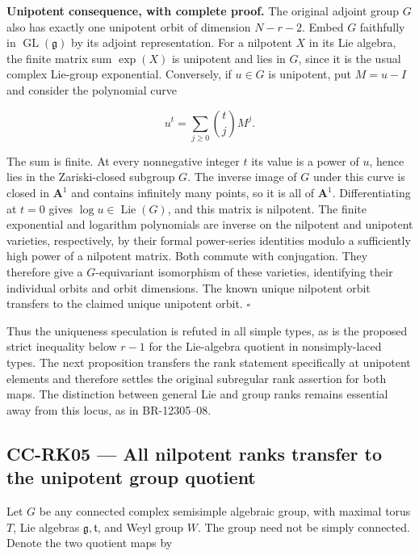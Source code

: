 \documentclass[11pt,a4paper]{article}
\theoremstyle{definition}\newtheorem{definition}[theorem]{Definition}
\theoremstyle{remark}\newtheorem{remark}[theorem]{Remark}
\begin{document}
\textbf{Unipotent consequence, with complete proof.} The original adjoint group \(G\) also has exactly one unipotent orbit of dimension \(N-r-2\). Embed \(G\) faithfully in \(\operatorname{GL}(\mathfrak g)\) by its adjoint representation. For a nilpotent \(X\) in its Lie algebra, the finite matrix sum \(\exp(X)\) is unipotent and lies in \(G\), since it is the usual complex Lie-group exponential. Conversely, if \(u\in G\) is unipotent, put \(M=u-I\) and consider the polynomial curve

\[
 u^t=\sum_{j\geq0}\binom tj M^j.
\]

The sum is finite. At every nonnegative integer \(t\) its value is a power of \(u\), hence lies in the Zariski-closed subgroup \(G\). The inverse image of \(G\) under this curve is closed in \(\mathbf A^1\) and contains infinitely many points, so it is all of \(\mathbf A^1\). Differentiating at \(t=0\) gives \(\log u\in\operatorname{Lie}(G)\), and this matrix is nilpotent. The finite exponential and logarithm polynomials are inverse on the nilpotent and unipotent varieties, respectively, by their formal power-series identities modulo a sufficiently high power of a nilpotent matrix. Both commute with conjugation. They therefore give a \(G\)-equivariant isomorphism of these varieties, identifying their individual orbits and orbit dimensions. The known unique nilpotent orbit transfers to the claimed unique unipotent orbit. \(\square\)

Thus the uniqueness speculation is refuted in all simple types, as is the proposed strict inequality below \(r-1\) for the Lie-algebra quotient in nonsimply-laced types. The next proposition transfers the rank statement specifically at unipotent elements and therefore settles the original subregular rank assertion for both maps. The distinction between general Lie and group ranks remains essential away from this locus, as in BR-12305--08.

\subsection{CC-RK05 --- All nilpotent ranks transfer to the unipotent group quotient}\label{cc-rk05-all-nilpotent-ranks-transfer-to-the-unipotent-group-quotient}

Let \(G\) be any connected complex semisimple algebraic group, with maximal torus \(T\), Lie algebras \(\mathfrak g,\mathfrak t\), and Weyl group \(W\). The group need not be simply connected. Denote the two quotient maps by
\end{document}
